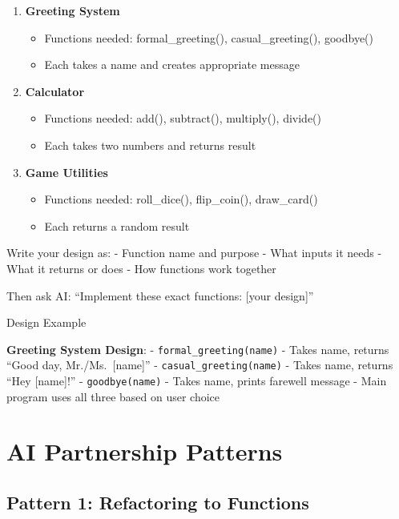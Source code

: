 \documentclass[
  letterpaper,
  DIV=11,
  numbers=noendperiod,
  oneside]{scrreprt}
\providecommand{\tightlist}{%
  \setlength{\itemsep}{0pt}\setlength{\parskip}{0pt}}\usepackage{longtable,booktabs,array}
\begin{document}
\begin{enumerate}
\def\labelenumi{\arabic{enumi}.}
\tightlist
\item
  \textbf{Greeting System}

  \begin{itemize}
  \tightlist
  \item
    Functions needed: formal\_greeting(), casual\_greeting(), goodbye()
  \item
    Each takes a name and creates appropriate message
  \end{itemize}
\item
  \textbf{Calculator}

  \begin{itemize}
  \tightlist
  \item
    Functions needed: add(), subtract(), multiply(), divide()
  \item
    Each takes two numbers and returns result
  \end{itemize}
\item
  \textbf{Game Utilities}

  \begin{itemize}
  \tightlist
  \item
    Functions needed: roll\_dice(), flip\_coin(), draw\_card()
  \item
    Each returns a random result
  \end{itemize}
\end{enumerate}

Write your design as: - Function name and purpose - What inputs it needs
- What it returns or does - How functions work together

Then ask AI: ``Implement these exact functions: {[}your design{]}''

Design Example

\textbf{Greeting System Design}: - \texttt{formal\_greeting(name)} -
Takes name, returns ``Good day, Mr./Ms.~{[}name{]}'' -
\texttt{casual\_greeting(name)} - Takes name, returns ``Hey
{[}name{]}!'' - \texttt{goodbye(name)} - Takes name, prints farewell
message - Main program uses all three based on user choice

\section{AI Partnership Patterns}\label{ai-partnership-patterns-5}

\subsection{Pattern 1: Refactoring to
Functions}\label{pattern-1-refactoring-to-functions}
\end{document}
